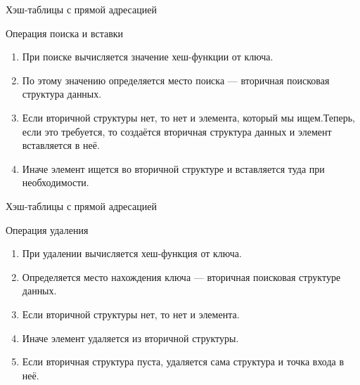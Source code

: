 \documentclass{beamer}
\begin{document}
\begin{frame}{Хэш-таблицы с прямой адресацией}
    \begin{block}{Операция поиска и вставки}
        \begin{enumerate}
            \item При поиске вычисляется значение хеш-функции от ключа.
            \item По этому значению определяется место поиска — вторичная поисковая структура данных.
            \item Если вторичной структуры нет, то нет и элемента, который мы ищем.Теперь, если это требуется, то создаётся вторичная структура данных и элемент вставляется в неё.
            \item Иначе элемент ищется во вторичной структуре и вставляется туда при необходимости.
        \end{enumerate}
    \end{block}
\end{frame} 

\begin{frame}{Хэш-таблицы с прямой адресацией}
    \begin{block}{Операция удаления}
        \begin{enumerate}
            \item При удалении вычисляется хеш-функция от ключа.
            \item Определяется место нахождения ключа — вторичная поисковая структуре данных.
            \item Если вторичной структуры нет, то нет и элемента.
            \item Иначе элемент удаляется из вторичной структуры.
            \item Если вторичная структура пуста, удаляется сама структура и точка входа в неё.
        \end{enumerate}
    \end{block}
\end{frame} 
\end{document}
